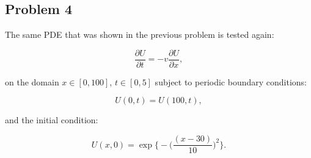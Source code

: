 \clearpage

\subsection{Problem 4}

The same PDE that was shown in the previous problem is tested again:

\begin{equation}
    \frac{\partial U}{\partial t} = -v\frac{\partial U}{\partial x},
    \label{eq:convection_PDE}
\end{equation}

\noindent on the domain $x \in [0, 100]$, $t \in [0, 5]$ subject to periodic boundary conditions:

\begin{equation}
    U(0,t) = U(100, t),
\end{equation}

\noindent and the initial condition:

\begin{equation}
    U(x,0) = \exp\bigg\{-\bigg(\frac{(x-30)}{10}\bigg)^{2}\bigg\}.
\end{equation}


